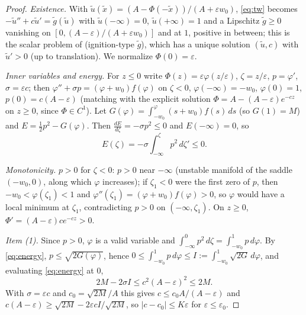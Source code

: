 \documentclass[11pt]{amsart}
\theoremstyle{remark}
\newcommand{\ve}{\varepsilon}
\begin{document}
\begin{proof}
\emph{Existence.} With $\tilde u(\tilde x)=(A-\Phi(-\tilde x))/(A+\ve w_0)$,
\eqref{eq:tw} becomes $-\tilde u''+c\tilde u'=\tilde g(\tilde u)$ with
$\tilde u(-\infty)=0$, $\tilde u(+\infty)=1$ and a Lipschitz
$\tilde g\ge0$ vanishing on $[0,(A-\ve)/(A+\ve w_0)]$ and at $1$, positive in
between; this is the scalar problem of \cite[Thm.~3.1]{BNS} (ignition-type $\tilde g$), which has a
unique solution $(\tilde u,c)$ with $\tilde u'>0$ (up to translation). We
normalize $\Phi(0)=\ve$.

\emph{Inner variables and energy.} For $z\le0$ write $\Phi(z)=\ve\varphi(z/\ve)$,
$\zeta=z/\ve$, $p=\varphi'$, $\sigma=\ve c$; then
$\varphi''+\sigma p=(\varphi+w_0)f(\varphi)$ on $\zeta<0$,
$\varphi(-\infty)=-w_0$, $\varphi(0)=1$, $p(0)=c(A-\ve)$ (matching with the
explicit solution $\Phi=A-(A-\ve)e^{-cz}$ on $z\ge0$, since $\Phi\in C^1$). Let
$G(\varphi)=\int_{-w_0}^\varphi(s+w_0)f(s)\,ds$ (so $G(1)=M$) and
$E=\frac12p^2-G(\varphi)$. Then $\frac{dE}{d\zeta}=-\sigma p^2\le0$ and
$E(-\infty)=0$, so
\begin{equation}\label{eq:energy}
E(\zeta)=-\sigma\int_{-\infty}^{\zeta}p^2\,d\zeta'\le0 .
\end{equation}

\emph{Monotonicity.} $p>0$ for $\zeta<0$: $p>0$ near $-\infty$ (unstable
manifold of the saddle $(-w_0,0)$, along which $\varphi$ increases); if
$\zeta_1<0$ were the first zero of $p$, then $-w_0<\varphi(\zeta_1)<1$ and
$\varphi''(\zeta_1)=(\varphi+w_0)f(\varphi)>0$, so $\varphi$ would have a local
minimum at $\zeta_1$, contradicting $p>0$ on $(-\infty,\zeta_1)$. On $z\ge0$,
$\Phi'=(A-\ve)ce^{-cz}>0$.

\emph{Item (1).} Since $p>0$, $\varphi$ is a valid variable and
$\int_{-\infty}^0p^2\,d\zeta=\int_{-w_0}^1p\,d\varphi$. By \eqref{eq:energy},
$p\le\sqrt{2G(\varphi)}$, hence $0\le\int_{-w_0}^1p\,d\varphi\le
I:=\int_{-w_0}^1\sqrt{2G}\,d\varphi$, and evaluating \eqref{eq:energy} at $0$,
\[
2M-2\sigma I\le c^2(A-\ve)^2\le 2M .
\]
With $\sigma=\ve c$ and $c_0=\sqrt{2M}/A$ this gives
$c\le c_0A/(A-\ve)$ and $c(A-\ve)\ge\sqrt{2M}-2\ve cI/\sqrt{2M}$, so
$|c-c_0|\le K\ve$ for $\ve\le\ve_0$.


\end{proof}
\end{document}
